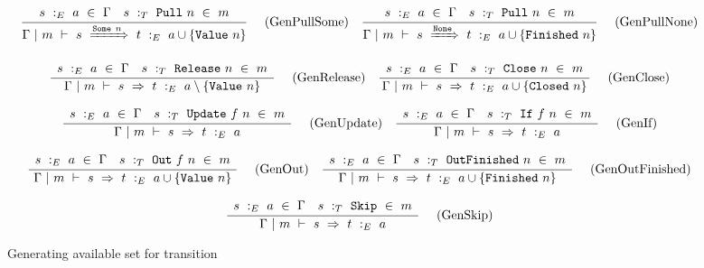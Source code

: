 
\begin{figure*}

$$
\frac {\displaystyle 
    \begin{array}{lr}
        s~:_E~ a ~\in~ \Gamma                    &
        s ~:_T~ \mathtt{Pull}~n ~\in~m 
    \end{array}
} {\displaystyle  
    \Gamma ~|~ m ~\vdash~ s~\xRightarrow{ \mathtt{Some}~n }~t ~:_E~  a \cup \{ \mathtt{Value}~n \} 
} \ 
\quad
\textrm{(GenPullSome)}
\quad
\frac {\displaystyle 
    \begin{array}{lr}
        s~:_E~ a ~\in~ \Gamma                    &
        s ~:_T~ \mathtt{Pull}~n ~\in~m
    \end{array}
} {\displaystyle  
    \Gamma ~|~ m ~\vdash~ s~\xRightarrow{ \mathtt{None}}~t ~:_E~  a \cup \{ \mathtt{Finished}~n \} 
} \ 
\quad
\textrm{(GenPullNone)}
$$

$$
\frac {\displaystyle 
    \begin{array}{lr}
        s~:_E~ a ~\in~ \Gamma                        &
        s ~:_T~ \mathtt{Release}~n ~\in~m
    \end{array}
} {\displaystyle  
    \Gamma ~|~ m ~\vdash~ s~\Rightarrow~t ~:_E~  a \setminus \{ \mathtt{Value}~n \} 
} \ 
\quad
\textrm{(GenRelease)}
\quad
\frac {\displaystyle 
    \begin{array}{lr}
        s~:_E~ a ~\in~ \Gamma                    &
        s ~:_T~ \mathtt{Close}~n ~\in~m
    \end{array}
} {\displaystyle  
    \Gamma ~|~ m ~\vdash~ s~\Rightarrow~t ~:_E~  a \cup \{ \mathtt{Closed}~n \} 
} \ 
\quad
\textrm{(GenClose)}
$$

$$
\frac {\displaystyle 
    \begin{array}{lr}
        s~:_E~ a ~\in~ \Gamma                        &
        s ~:_T~ \mathtt{Update}~f~n ~\in~m
    \end{array}
} {\displaystyle  
    \Gamma ~|~ m ~\vdash~ s~\Rightarrow~t ~:_E~  a 
} \ 
\quad
\textrm{(GenUpdate)}
\quad
\frac {\displaystyle 
    \begin{array}{lr}
        s~:_E~ a ~\in~ \Gamma                    &
        s ~:_T~ \mathtt{If}~f~n ~\in~m
    \end{array}
} {\displaystyle  
    \Gamma ~|~ m ~\vdash~ s~\Rightarrow~t ~:_E~  a 
} \ 
\quad
\textrm{(GenIf)}
$$

$$
\frac {\displaystyle 
    \begin{array}{lr}
        s~:_E~ a ~\in~ \Gamma                      &
        s ~:_T~ \mathtt{Out}~f~n ~\in~m
    \end{array}
} {\displaystyle  
    \Gamma ~|~ m ~\vdash~ s~\Rightarrow~t ~:_E~  a \cup \{ \mathtt{Value}~n \} 
} \ 
\quad
\textrm{(GenOut)}
\quad
\frac {\displaystyle 
    \begin{array}{lr}
        s~:_E~ a ~\in~ \Gamma                           &
        s ~:_T~ \mathtt{OutFinished}~n ~\in~m
    \end{array}
} {\displaystyle  
    \Gamma ~|~ m ~\vdash~ s~\Rightarrow~t ~:_E~  a \cup \{ \mathtt{Finished}~n \} 
} \ 
\quad
\textrm{(GenOutFinished)}
$$

$$
\frac {\displaystyle 
    \begin{array}{lr}
        s~:_E~ a ~\in~ \Gamma                 &
        s ~:_T~ \mathtt{Skip} ~\in~m
    \end{array}
} {\displaystyle  
    \Gamma ~|~ m ~\vdash~ s~\Rightarrow~t ~:_E~  a 
} \ 
\quad
\textrm{(GenSkip)}
$$


\caption{Generating available set for transition}
\label{fig:inv:generation}
\end{figure*}

